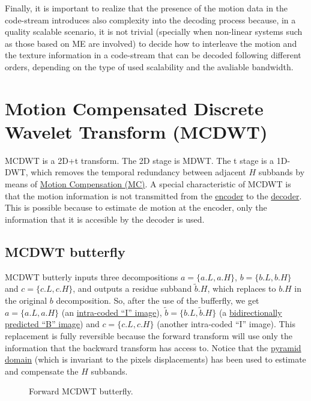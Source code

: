 Finally, it is important to realize that the presence of the motion
data in the code-stream introduces also complexity into the decoding
process because, in a quality scalable scenario, it is not trivial
(specially when non-linear systems such as those based on ME are
involved) to decide how to interleave the motion and the texture
information in a code-stream that can be decoded following different
orders, depending on the type of used scalability and the avaliable
bandwidth.

\section{Motion Compensated Discrete Wavelet Transform (MCDWT)}
MCDWT is a 2D+t transform. The 2D stage is MDWT. The t stage is a
1D-DWT, which removes the temporal redundancy between adjacent $H$
subbands by means of
\href{https://en.wikipedia.org/wiki/Motion_compensation}{Motion
  Compensation (MC)}. A special characteristic of MCDWT is that the
motion information is not transmitted from the
\href{https://en.wikipedia.org/wiki/Encoder}{encoder} to the
\href{https://en.wikipedia.org/wiki/Decoder}{decoder}. This is
possible because to estimate de motion at the encoder, only the
information that it is accesible by the decoder is used.

\subsection{MCDWT butterfly}

MCDWT butterly inputs three decompositions $a=\{a.L, a.H\}$, $b=\{b.L,
b.H\}$ and $c=\{c.L, c.H\}$, and outputs a residue subband
$\tilde{b}.H$, which replaces to $b.H$ in the original $b$
decomposition. So, after the use of the bufferfly, we get $a=\{a.L,
a.H\}$ (an
\href{https://en.wikipedia.org/wiki/Video_compression_picture_types}{intra-coded
  ``I'' image}), $\tilde{b}=\{b.L, \tilde{b}.H\}$ (a
\href{https://en.wikipedia.org/wiki/Video_compression_picture_types}{bidirectionally
  predicted ``B'' image}) and $c=\{c.L, c.H\}$ (another intra-coded
``I'' image). This replacement is fully reversible because the forward
transform will use only the information that the backward transform
has access to. Notice that the
\href{http://www.vtvt.ece.vt.edu/research/references/video/DCT_Video_Compression/Zhang92a.pdf}{pyramid
  domain} (which is invariant to the pixels displacements) has been
used to estimate and compensate the $H$ subbands.

\begin{figure}
\centering
{}
\caption{Forward MCDWT butterfly.\label{fig:forward_butterfly}}
\end{figure}



